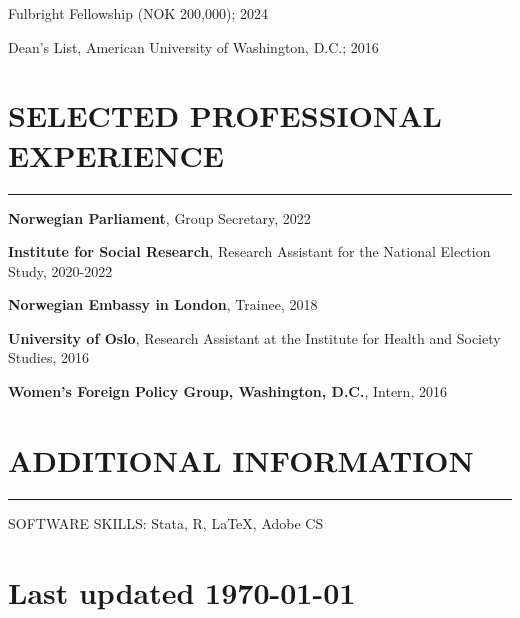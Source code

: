 \documentclass{article}
\newcommand{\cvsection}[1]{\section*{\normalfont#1} \vspace{-0.15cm}\hrule \hspace{1.6em}}
\begin{document}
\noindent
\hspace{0.4em}
Fulbright Fellowship (NOK 200,000); 2024

\noindent
\hspace{0.4em}
Dean's List, American University of Washington, D.C.; 2016

\cvsection{SELECTED PROFESSIONAL EXPERIENCE}

\noindent
\hspace{0.4em}
\textbf{Norwegian Parliament}, Group Secretary, 2022

\noindent
\hspace{0.4em}
\textbf{Institute for Social Research}, Research Assistant for the National Election Study, 2020-2022

\noindent
\hspace{0.4em}
\textbf{Norwegian Embassy in London}, Trainee, 2018

\noindent
\hspace{0.4em}
\textbf{University of Oslo}, Research Assistant at the Institute for Health and Society Studies, 2016

\noindent
\hspace{0.4em}
\textbf{Women's Foreign Policy Group, Washington, D.C.}, Intern, 2016


\cvsection{ADDITIONAL INFORMATION}

\noindent
\hspace{0.4em}
SOFTWARE SKILLS: Stata, R, \LaTeX, Adobe CS

\vfill

\section*{\hfill \normalfont \small Last updated \today}
\end{document}
